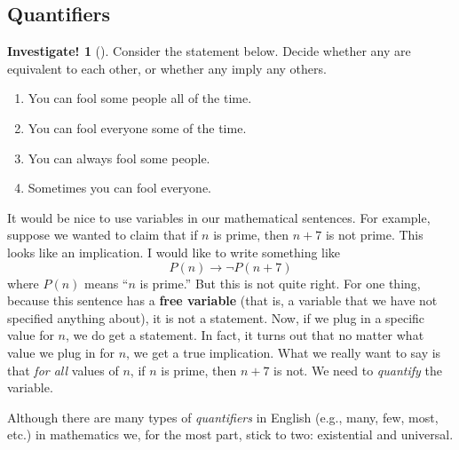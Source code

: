 \documentclass[10pt,]{book}
\newcommand{\terminology}[1]{\textbf{#1}}
\theoremstyle{plain}
\theoremstyle{definition}
\theoremstyle{definition}
\theoremstyle{definition}
\newtheorem{investigation}[project]{Investigate!}
\theoremstyle{definition}
\numberwithin{equation}{chapter}
\def\imp{\rightarrow}
\begin{document}
\subsection[{Quantifiers}]{Quantifiers}\label{subsec_quantifiers}
\begin{investigation}[]\label{investigation-11}
\hypertarget{p-1348}{}%
Consider the statement below. Decide whether any are equivalent to each other, or whether any imply any others.%
\par
\hypertarget{p-1349}{}%
%
\begin{enumerate}
\item\hypertarget{li-319}{}\hypertarget{p-1350}{}%
You can fool some people all of the time.%
\item\hypertarget{li-320}{}\hypertarget{p-1351}{}%
You can fool everyone some of the time.%
\item\hypertarget{li-321}{}\hypertarget{p-1352}{}%
You can always fool some people.%
\item\hypertarget{li-322}{}\hypertarget{p-1353}{}%
Sometimes you can fool everyone.%
\end{enumerate}
%
\end{investigation}
\hypertarget{p-1354}{}%
It would be nice to use variables in our mathematical sentences. For example, suppose we wanted to claim that if \(n\) is prime, then \(n+7\) is not prime. This looks like an implication. I would like to write something like%
\begin{equation*}
P(n) \imp \neg P(n+7) 
\end{equation*}
where \(P(n)\) means ``\(n\) is prime.'' But this is not quite right. For one thing, because this sentence has a \terminology{free variable} (that is, a variable that we have not specified anything about), it is not a statement. Now, if we plug in a specific value for \(n\), we do get a statement. In fact, it turns out that no matter what value we plug in for \(n\), we get a true implication. What we really want to say is that \emph{for all} values of \(n\), if \(n\) is prime, then \(n+7\) is not. We need to \emph{quantify} the variable.%
\par
\hypertarget{p-1355}{}%
Although there are many types of \emph{quantifiers} in English (e.g., many, few, most, etc.) in mathematics we, for the most part, stick to two: existential and universal.%
\end{document}
